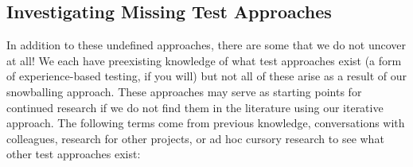 
\clearpage
\subsection{Investigating Missing Test Approaches}\label{future-miss-terms}
In addition to these undefined approaches, there are some that we do not
uncover at all! We each have preexisting knowledge of what test approaches
exist (a form of experience-based testing, if you will) but not all of these
arise as a result of our snowballing approach. These approaches may
serve as starting points for continued research if we do not find them in
the literature using our iterative approach. The following terms come from
previous knowledge, conversations with colleagues, research for other
projects, or ad hoc cursory research to see what other test approaches exist:
\newline


